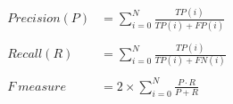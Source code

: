 \begin{equation}
    \begin{aligned}
        Precision(P) & = \sum_{i=0}^{N}\frac{TP(i)}{TP(i) + FP(i)}   \\ \\
        Recall(R)    & = \sum_{i=0}^{N}\frac{TP(i)}{TP(i) + FN(i)}   \\ \\
        F~measure    & = 2 \times \sum_{i=0}^{N}\frac{P\cdot R}{P+R} \\
    \end{aligned}
    \label{system:eq:f-score}
\end{equation}